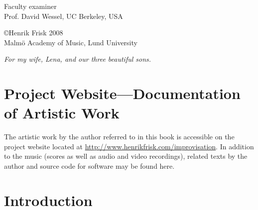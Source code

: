 \documentclass[a4paper]{book}
\numberwithin{equation}{section}
\begin{document}
\vspace{1cm}

\begin{minipage}[l]{\linewidth}
Faculty examiner
\\[.3cm]
Prof. David Wessel, UC Berkeley, USA
\end{minipage}

\vspace{3cm}

\begin{minipage}[l]{\linewidth}
\copyright Henrik Frisk 2008\\
Malm\"{o} Academy of Music, Lund University
\end{minipage}


\cleardoublepage
\vspace*{4cm}
\begin{center}
\emph{For my wife, Lena, and our three beautiful sons.}
\end{center}



\chapter*{Project Website---Documentation of Artistic Work}
\label{sec:artistic}

The artistic work by the author referred to in this book is accessible on the project website located at \url{http://www.henrikfrisk.com/improvisation}. In addition to the music (scores as well as audio and video recordings), related texts by the author and source code for software may be found here.

\tableofcontents
\label{sec:toc}

\listoffigures
\label{sec:figures}


\chapter{Introduction}
\label{sec:introduction}
\pagestyle{fancy}
\setcounter{page}{1}


\end{document}
